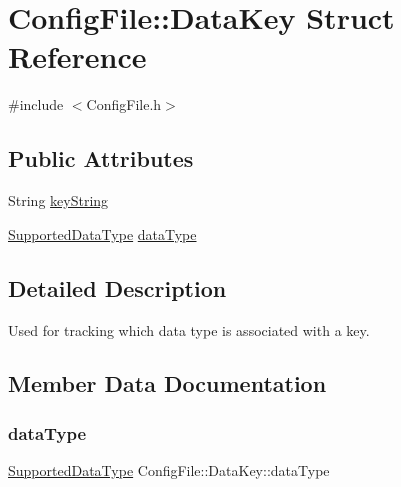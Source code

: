 \hypertarget{structConfigFile_1_1DataKey}{}\section{Config\+File\+:\+:Data\+Key Struct Reference}
\label{structConfigFile_1_1DataKey}


{\ttfamily \#include $<$Config\+File.\+h$>$}

\subsection*{Public Attributes}
\begin{DoxyCompactItemize}
\item 
String \mbox{\hyperlink{structConfigFile_1_1DataKey_a843110daf734321824afbafb5fe8956e}{key\+String}}
\item 
\mbox{\hyperlink{classConfigFile_aed5da60a5b6856a240c88d20c8975dce}{Supported\+Data\+Type}} \mbox{\hyperlink{structConfigFile_1_1DataKey_a65d92369e961aa70657f240edc2a3390}{data\+Type}}
\end{DoxyCompactItemize}


\subsection{Detailed Description}
Used for tracking which data type is associated with a key. 

\subsection{Member Data Documentation}
\mbox{\label{structConfigFile_1_1DataKey_a65d92369e961aa70657f240edc2a3390}} 
\subsubsection{\texorpdfstring{data\+Type}{dataType}}
{\footnotesize\ttfamily \mbox{\hyperlink{classConfigFile_aed5da60a5b6856a240c88d20c8975dce}{Supported\+Data\+Type}} Config\+File\+::\+Data\+Key\+::data\+Type}

\mbox{\label{structConfigFile_1_1DataKey_a843110daf734321824afbafb5fe8956e}} 
